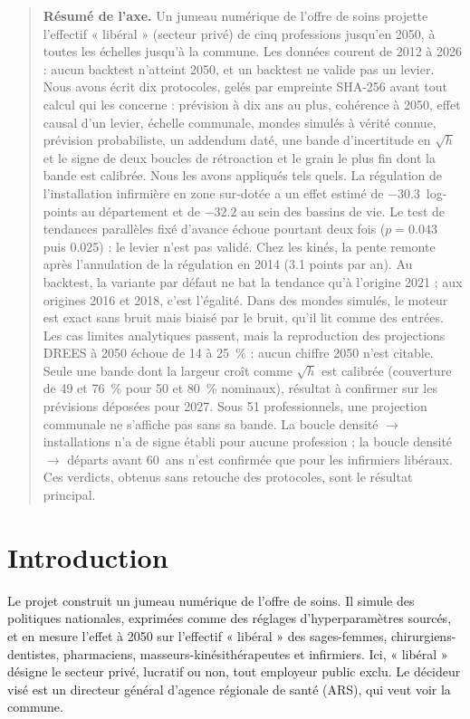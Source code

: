 \begin{quote}\small\textbf{Résumé de l'axe.} Un jumeau numérique de l'offre de soins projette l'effectif « libéral » (secteur privé) de cinq
professions jusqu'en 2050, à toutes les échelles jusqu'à la commune. Les données courent de 2012 à
2026 : aucun backtest n'atteint 2050, et un backtest ne valide pas un levier. Nous avons écrit dix
protocoles, gelés par empreinte SHA-256 avant tout calcul qui les concerne : prévision à dix ans au
plus, cohérence à 2050, effet causal d'un levier, échelle communale, mondes simulés à vérité connue,
prévision probabiliste, un addendum daté, une bande d'incertitude en $\sqrt h$ et le signe de deux boucles de rétroaction et le grain le plus fin dont la bande est calibrée. Nous les avons appliqués tels quels. La régulation de
l'installation infirmière en zone sur-dotée a un effet estimé de $\num{-30.3}$\mesure{}~log-points
au département et de $\num{-32.2}$\mesure{} au sein des bassins de vie. Le test de tendances
parallèles fixé d'avance échoue pourtant deux fois ($p = \num{0.043}$\mesure{} puis
\num{0.025}\mesure{}) : le levier n'est pas validé. Chez les kinés, la pente remonte après
l'annulation de la régulation en 2014 (\num{3.1}\mesure{} points par an). Au backtest, la variante
par défaut ne bat la tendance qu'à l'origine 2021 ; aux origines 2016 et 2018, c'est l'égalité. Dans
des mondes simulés, le moteur est exact sans bruit mais biaisé par le bruit, qu'il lit comme des
entrées. Les cas limites analytiques passent, mais la reproduction des projections DREES à 2050
échoue de 14 à 25\mesure{}~\% : aucun chiffre 2050 n'est citable. Seule une bande dont la largeur
croît comme $\sqrt h$ est calibrée (couverture de 49 et 76\mesure{}~\% pour 50 et 80~\% nominaux),
résultat à confirmer sur les prévisions déposées pour 2027. Sous 51\mesure{} professionnels, une
projection communale ne s'affiche pas sans sa bande. La boucle densité $\to$ installations n'a de signe
établi pour aucune profession ; la boucle densité $\to$ départs avant 60~ans n'est confirmée que pour les
infirmiers libéraux. Ces verdicts, obtenus sans retouche des
protocoles, sont le résultat principal.\end{quote}

\section{Introduction}
Le projet construit un jumeau numérique de l'offre de soins. Il simule des politiques nationales,
exprimées comme des réglages d'hyperparamètres sourcés, et en mesure l'effet à 2050 sur l'effectif
« libéral » des sages-femmes, chirurgiens-dentistes, pharmaciens, masseurs-kinésithérapeutes et
infirmiers. Ici, « libéral » désigne le secteur privé, lucratif ou non, tout employeur public
exclu. Le décideur visé est un directeur général d'agence régionale de santé (ARS), qui veut voir la
commune.

